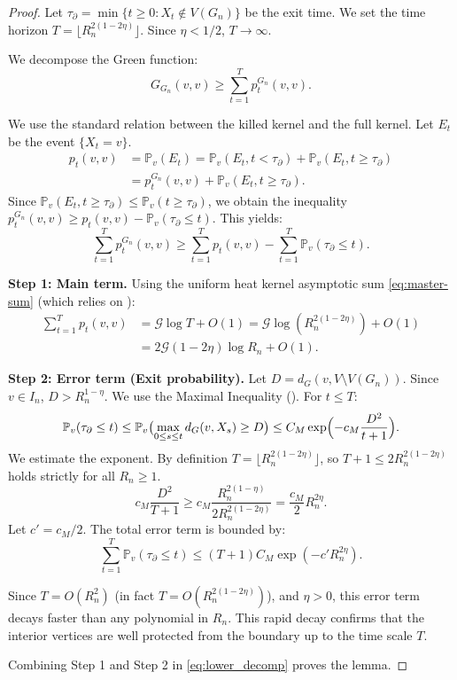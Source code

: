 \documentclass[reqno]{amsart}
\numberwithin{equation}{section}
\theoremstyle{definition}
\theoremstyle{remark}
\newcommand{\cG}{\mathcal{G}}
\newcommand{\Prob}{\mathbb{P}}
\begin{document}
\begin{proof}
Let $\tau_{\partial} = \min\{t \geq 0 : X_t \notin V(G_n)\}$ be the exit time. We set the time horizon $T = \lfloor R_n^{2(1-2\eta)} \rfloor$. Since $\eta < 1/2$, $T \to \infty$.

We decompose the Green function:
\[
G_{G_n}(v,v) \geq \sum_{t=1}^{T} p_t^{G_n}(v,v).
\]

We use the standard relation between the killed kernel and the full kernel. Let $E_t$ be the event $\{X_t = v\}$.
\begin{align*}
p_t(v,v) &= \Prob_v(E_t) = \Prob_v(E_t, t < \tau_{\partial}) + \Prob_v(E_t, t \geq \tau_{\partial}) \\
&= p_t^{G_n}(v,v) + \Prob_v(E_t, t \geq \tau_{\partial}).
\end{align*}
Since $\Prob_v(E_t, t \geq \tau_{\partial}) \leq \Prob_v(t \geq \tau_{\partial})$, we obtain the inequality $p_t^{G_n}(v,v) \geq p_t(v,v) - \Prob_v(\tau_{\partial} \leq t)$. This yields:
\begin{equation}\label{eq:lower_decomp}
\sum_{t=1}^{T} p_t^{G_n}(v,v) \geq \sum_{t=1}^{T} p_t(v,v) - \sum_{t=1}^{T} \Prob_v(\tau_{\partial} \leq t).
\end{equation}

\textbf{Step 1: Main term.} Using the uniform heat kernel asymptotic sum \eqref{eq:master-sum} (which relies on ):
\begin{align*}
\sum_{t=1}^{T} p_t(v,v) &= \cG \log T + O(1)
  = \cG \log(R_n^{2(1-2\eta)}) + O(1) \\
&= 2\cG (1-2\eta)\log R_n + O(1).
\end{align*}

\textbf{Step 2: Error term (Exit probability).} Let $D = d_G(v, V \setminus V(G_n))$. Since $v \in I_n$, $D > R_n^{1-\eta}$. We use the Maximal Inequality (). For $t \leq T$:
\[
\Prob_v(\tau_{\partial} \leq t) \leq \Prob_v\bigl( \max_{0 \leq s \leq t} d_G(v,X_s) \geq D \bigr) \leq C_M \exp\Bigl(-c_M \frac{D^2}{t+1}\Bigr).
\]
We estimate the exponent. By definition $T = \lfloor R_n^{2(1-2\eta)} \rfloor$, so $T+1 \leq 2 R_n^{2(1-2\eta)}$ holds strictly for all $R_n \geq 1$.
\[
c_M \frac{D^2}{T+1} \geq c_M \frac{R_n^{2(1-\eta)}}{2 R_n^{2(1-2\eta)}} = \frac{c_M}{2} R_n^{2\eta}.
\]
Let $c' = c_M/2$. The total error term is bounded by:
\[
\sum_{t=1}^T \Prob_v(\tau_{\partial} \leq t) \leq (T+1) C_M \exp(-c' R_n^{2\eta}).
\]

Since $T = O(R_n^2)$ (in fact $T=O(R_n^{2(1-2\eta)})$), and $\eta>0$, this error term decays faster than any polynomial in $R_n$. This rapid decay confirms that the interior vertices are well protected from the boundary up to the time scale $T$.

Combining Step 1 and Step 2 in \eqref{eq:lower_decomp} proves the lemma.
\end{proof}
\end{document}
